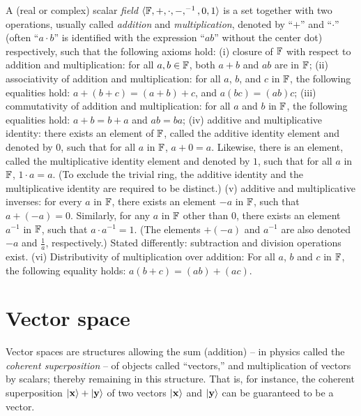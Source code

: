 A (real or complex) scalar {\em field}  $\langle  {\Bbb F} , +, \cdot , -, ^{-1}, 0, 1\rangle$
is a set together with two operations,
usually called {\em addition} and {\em multiplication},   denoted by ``$+$'' and ``$\cdot$''
(often  ``$a\cdot b$'' is identified with the expression ``$ab$'' without the center dot)
respectively, such that the following  axioms hold:
 (i)
closure of ${\Bbb F}$ with respect to addition and multiplication:
for all $a, b \in {\Bbb F}$, both $a + b$ and $a   b$ are in ${\Bbb F}$;
 (ii)
associativity of addition and multiplication:
for all $a$, $b$, and $c$ in ${\Bbb F}$,
the following equalities hold: $a + (b + c) = (a + b) + c$,
and
$a (b c) = (a  b) c$;
 (iii)
commutativity of addition and multiplication:
for all $a$ and $b$ in ${\Bbb F}$, the following equalities hold: $a + b = b + a$ and $a b = b  a$;
 (iv)
additive and multiplicative identity:
there exists an element of ${\Bbb F}$,
called the additive identity element and denoted by $0$, such that for all $a$ in ${\Bbb F}$,
$a + 0 = a$.
Likewise, there is an element, called the multiplicative identity element and denoted by $1$,
such that for all $a$ in ${\Bbb F}$, $1 \cdot a  = a$.
(To exclude the trivial ring, the additive identity and the multiplicative
identity are required to be distinct.)
 (v)
additive and multiplicative inverses:
for every $a$ in ${\Bbb F}$, there exists an element $-a$ in ${\Bbb F}$, such that $a + (-a) = 0$.
Similarly, for any $a$ in ${\Bbb F}$ other than $0$, there exists an element $a^{-1}$ in ${\Bbb F}$,
such that $a \cdot a^{-1} = 1$.
(The elements $+ (-a)$ and  $a^{-1}$
are also denoted $-a$ and $\frac{1}{a}$, respectively.)
Stated differently: subtraction and division operations exist.
 (vi)
Distributivity of multiplication over addition:
For all $a$, $b$ and $c$ in ${\Bbb F}$, the following equality holds:
$a (b + c) = (a  b) + (a  c)$.


\section{Vector space}

Vector spaces are structures allowing the
sum (addition) -- in physics called the {\em coherent superposition} -- of objects called ``vectors,'' and multiplication
of vectors by scalars; thereby remaining in this structure.
That is, for instance, the coherent superposition  $\vert {\bf x}  \rangle + \vert {\bf y} \rangle $
of two vectors $\vert {\bf x} \rangle $ and $ \vert {\bf y} \rangle $ can be guaranteed to
be a vector.

